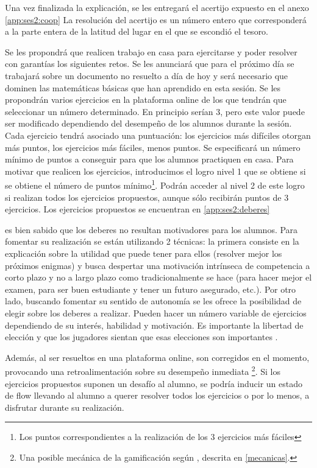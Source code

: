 Una vez finalizada la explicación, se les entregará el acertijo expuesto en el anexo \ref{app:ses2:coop}
%
La resolución del acertijo es un número entero que corresponderá a la parte entera de la latitud del lugar en el que se escondió el tesoro.



Se les propondrá que realicen trabajo en casa para ejercitarse y poder resolver con garantías los siguientes retos.
%
Se les anunciará que para el próximo día se trabajará sobre un documento no resuelto a día de hoy y será necesario que dominen las matemáticas básicas que han aprendido en esta sesión.
%
Se les propondrán varios ejercicios en la plataforma online de los que tendrán que seleccionar un número determinado. 
%
En principio serían 3, pero este valor puede ser modificado dependiendo del desempeño de los alumnos durante la sesión.
%
Cada ejercicio tendrá asociado una puntuación: los ejercicios más difíciles otorgan más puntos, los ejercicios más fáciles, menos puntos.
%
Se especificará un número mínimo de puntos a conseguir para que los alumnos practiquen en casa. 
%
Para motivar que realicen los ejercicios, introducimos el logro  nivel 1 que se obtiene si se obtiene el número de puntos mínimo\footnote{Los puntos correspondientes a la realización de los 3 ejercicios más fáciles}.
%
Podrán acceder al nivel 2 de este logro si realizan todos los ejercicios propuestos, aunque sólo recibirán puntos de 3 ejercicios.
%
Los ejercicios propuestos se encuentran en \ref{app:ses2:deberes}

	es bien sabido que los deberes no resultan motivadores para los alumnos. 
	Para fomentar su realización se están utilizando 2 técnicas: 
	la primera consiste en la explicación sobre la utilidad que puede tener para ellos (resolver mejor los próximos enigmas) y busca despertar una motivación intrínseca de competencia a corto plazo y no a largo plazo como tradicionalmente se hace (para hacer mejor el examen, para ser buen estudiante y tener un futuro asegurado, etc.).
	Por otro lado, buscando fomentar su sentido de autonomía se les ofrece la posibilidad de elegir sobre los deberes a realizar. 
	Pueden hacer un número variable de ejercicios dependiendo de su interés, habilidad y motivación.
	Es importante la libertad de elección y que los jugadores sientan que esas elecciones son importantes \citep{werbach2012win}.

	Además, al ser resueltos en una plataforma online, son corregidos en el momento, provocando una retroalimentación sobre su desempeño inmediata
	\footnote{Una posible mecánica de la gamificación según \citeauthor{werbach2012win}, descrita en \ref{mecanicas}.}.
	Si los ejercicios propuestos suponen un desafío al alumno, se podría inducir un estado de flow llevando al alumno a querer resolver todos los ejercicios o por lo menos, a disfrutar durante su realización.

